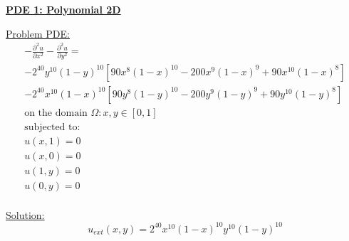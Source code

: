 \documentclass[.\jobname.tex]{subfiles}
\begin{document}
\begin{figure}[H]
	\centering
	\noindent{}
	\label{fig:sol_plot_0B}
\end{figure}



\newpage


\underline{\textbf{PDE 1: Polynomial 2D}} 

\underline{Problem PDE:} 
\begin{equation}
\label{eq:pde1}
\begin{split}
-\frac{\partial^2 u}{\partial x^2} - \frac{\partial^2 u}{\partial y^2} = \\
-2^{40}y^{10}(1-y)^{10}[90x^8(1-x)^{10} -200x^9(1-x)^9 + 90x^{10}(1-x)^8] \\
-2^{40}x^{10}(1-x)^{10}[90y^8(1-y)^{10} -200y^9(1-y)^9 + 90y^{10}(1-y)^8] \\
\text{on the domain } \Omega: x,y \in [0,1] \\
\text{subjected to: } \\
u(x,1) = 0 \\
u(x,0) = 0 \\
u(1,y) = 0 \\
u(0,y) = 0 \\
\end{split}
\end{equation}


\underline{Solution:} 
\begin{equation}
\label{eq:sol1}
u_{ext}(x,y) = 2^{40}x^{10}(1-x)^{10}y^{10}(1-y)^{10}
\end{equation}
\end{document}
